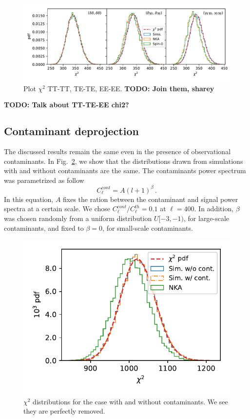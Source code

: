 \documentclass[a4paper,11pt]{article}
\newcommand{\todo}[1]{{\bf TODO: #1}}
\newcommand{\clth}{C_\ell^{th}}
\newcommand{\clc}{C_\ell^{cont}}
\begin{document}
\begin{figure}[htb]
  \centering
  \includegraphics[width=\textwidth]{./figures/run_sph_2b_1stbin_chi2_TT_TE_EE.pdf}
  \caption{Plot $\chi^2$ TT-TT, TE-TE, EE-EE. \todo{Join them, sharey}}
  \label{fig:chi2_1bin}
\end{figure}

\todo{Talk about TT-TE-EE chi2?}

\subsection{Contaminant deprojection}

The discussed results remain the same even in the presence of observational
contaminants. In Fig.~\ref{fig:chi2_conts}, we show that the distributions drawn
from simulations with and without contaminants are the same. The contaminants
power spectrum was parametrized as follow
\begin{equation}
  \clc = A (l + 1)^{\beta}\,.
  \label{eq:conts}
\end{equation}
In this equation, $A$ fixes the ration between the contaminant and signal
power spectra at a certain scale. We chose $\clc/\clth = 0.1$ at $\ell=400$.
In addition, $\beta$ was chosen randomly from a uniform distribution $U[-3,
-1)$, for large-scale contaminants, and fixed to $\beta=0$, for small-scale
contaminants. 

\begin{figure}[htb]
  \centering
  \includegraphics{./figures/contaminants_chi2.pdf}
  \caption{$\chi^2$ distributions for the case with and without contaminants.
    We see they are perfectly removed.}
  \label{fig:chi2_conts}
\end{figure}
\end{document}
